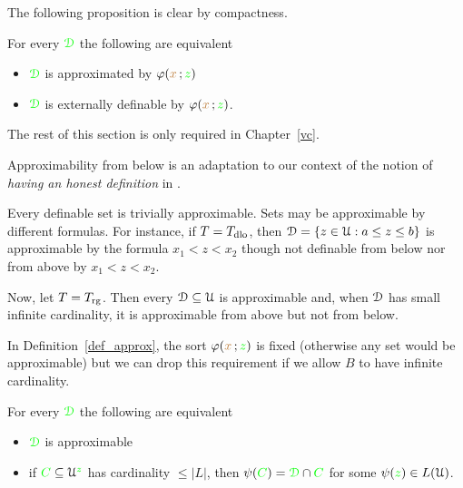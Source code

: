 The following proposition is clear by compactness.

\begin{proposition}\label{prop_approx=external}
   For every ${\color{green}\EuScript D}$ the following are equivalent
   \begin{itemize}
   \item[1.] ${\color{green}\EuScript D}$ is approximated by $\varphi({\color{brown} x}\,;{\color{green} z})$
   \item[2.] ${\color{green}\EuScript D}$ is externally definable by $\varphi({\color{brown} x}\,;{\color{green} z})$.
   \end{itemize}
\end{proposition}

The rest of this section is only required in Chapter~\ref{vc}.

Approximability from below is an adaptation to our context of the notion of \textit{having an honest definition} in \cite{CS}.

\begin{example}
Every definable set is trivially approximable.
Sets may be approximable by different formulas.
For instance, if $T=T_{\rm dlo}$, then $\EuScript D=\{z\in\EuScript U:a\le z\le b\}$ is approximable by the formula $x_1<z<x_2$ though not definable from below nor from above by $x_1<z<x_2$.

Now, let $T=T_{\rm rg}$.
Then every $\EuScript D\subseteq\EuScript U$ is approximable and, when $\EuScript D$ has small infinite cardinality, it is approximable from above but not from below.
\end{example}

In Definition~\ref{def_approx}, the sort $\varphi({\color{brown} x}\,;{\color{green} z})$ is fixed (otherwise any set would be approximable) but we can drop this requirement if we allow $B$ to have infinite cardinality.

\begin{proposition}\label{lem_approx_nonunif}
For every ${\color{green}\EuScript D}$ the following are equivalent
\begin{itemize}
\item[1.] ${\color{green}\EuScript D}$ is approximable
\item[2.] if ${\color{green} C}\subseteq\EuScript U^{\color{green} z}$ has cardinality $\le|L|$, then $\psi({\color{green} C})={\color{green}\EuScript D}\cap{\color{green}C}$ for some $\psi({\color{green} z})\in L(\EuScript U)$.
\end{itemize}
\end{proposition}


